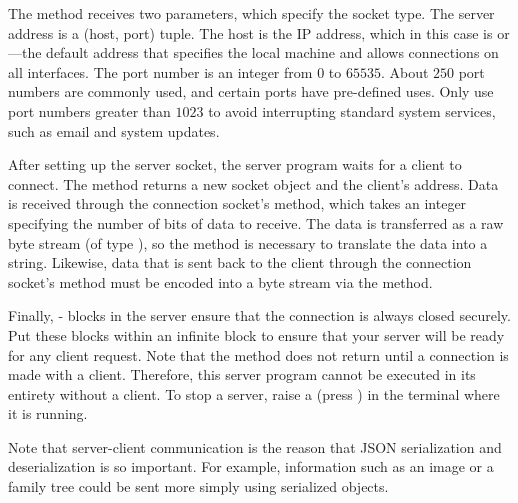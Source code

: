 The  method receives two parameters, which specify the socket type.
The server address is a (host, port) tuple.
The host is the IP address, which in this case is  or ---the default address that specifies the local machine and allows connections on all interfaces.
The port number is an integer from $0$ to $65535$.
About $250$ port numbers are commonly used, and certain ports have pre-defined uses.
Only use port numbers greater than $1023$ to avoid interrupting standard system services, such as email and system updates.

After setting up the server socket, the server program waits for a client to connect.
The  method returns a new socket object and the client's address.
Data is received through the connection socket's  method, which takes an integer specifying the number of bits of data to receive.
The data is transferred as a raw byte stream (of type ), so the  method is necessary to translate the data into a string.
Likewise, data that is sent back to the client through the connection socket's  method must be encoded into a byte stream via the  method.

Finally, - blocks in the server ensure that the connection is always closed securely.
Put these blocks within an infinite  block to ensure that your server will be ready for any client request.
Note that the  method does not return until a connection is made with a client.
Therefore, this server program cannot be executed in its entirety without a client.
To stop a server, raise a  (press ) in the terminal where it is running.

Note that server-client communication is the reason that JSON serialization and deserialization is so important.
For example, information such as an image or a family tree could be sent more simply using serialized objects.

\vspace{3mm}

